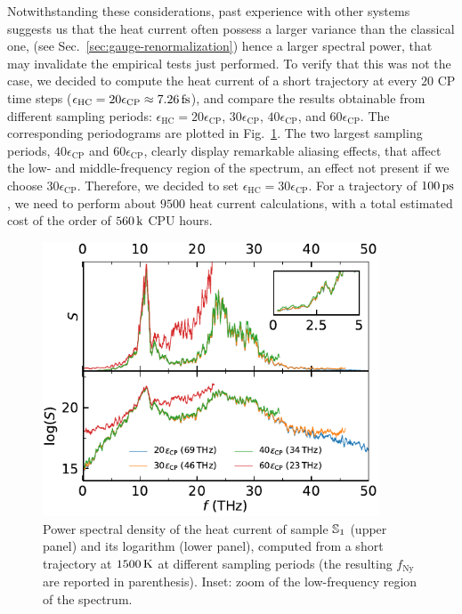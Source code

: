 Notwithstanding these considerations, past experience with other systems suggests us that the \abinitio heat current often possess a larger variance than the classical one, (see Sec.~\ref{sec:gauge-renormalization}) hence a larger spectral power, that may invalidate the empirical tests just performed. 
To verify that this was not the case, we decided to compute the \abinitio heat current of a short trajectory at every $20$ CP time steps ($\epsilon_\mathrm{HC} = 20 \epsilon_\mathrm{CP} \approx 7.26\,\mathrm{fs}$), and compare the results obtainable from different sampling periods: $\epsilon_\mathrm{HC} = 20\epsilon_\mathrm{CP}$, $30\epsilon_\mathrm{CP}$, $40\epsilon_\mathrm{CP}$, and $60\epsilon_\mathrm{CP}$. 
The corresponding periodograms are plotted in Fig.~\ref{fig:results-quantum-dt-choice}. The two largest sampling periods, $40\epsilon_\mathrm{CP}$ and $60\epsilon_\mathrm{CP}$, clearly display remarkable aliasing effects, that affect the low- and middle-frequency region of the spectrum, an effect not present if we choose $30\epsilon_\mathrm{CP}$. 
Therefore, we decided to set $\epsilon_\mathrm{HC} = 30\epsilon_\mathrm{CP}$. For a trajectory of $100\,\mathrm{ps}$, we need to perform about $9500$ heat current calculations, with a total estimated cost of the order of $560\,\mathrm{k}$ CPU hours. 

\begin{figure}[!tb]
    \centering
    \includegraphics[width=10cm]{chapters/chapter6/figures/qsilica_432_1500K_dt_choice.pdf}
    \caption{Power spectral density of the \abinitio heat current of sample $\S1$ (upper panel) and its logarithm (lower panel), computed from a short trajectory at $1500\,\mathrm{K}$ at different sampling periods (the resulting $f_\mathrm{Ny}$ are reported in parenthesis). Inset: zoom of the low-frequency region of the spectrum.}
    \label{fig:results-quantum-dt-choice}
\end{figure}


